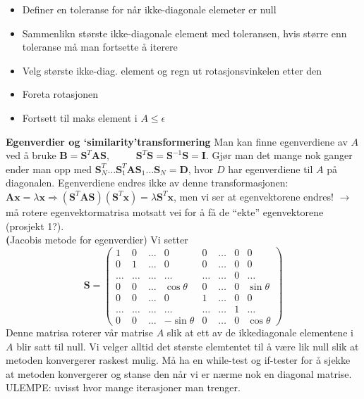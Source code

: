 \documentclass[12pt,a4paper,twocolumn]{article}
\begin{document}
\begin{flushleft}
\begin{itemize}
  \item Definer en toleranse for når ikke-diagonale elemeter er null
  \item Sammenlikn største ikke-diagonale element med toleransen, hvis større enn toleranse må man fortsette å iterere
  \item Velg største ikke-diag. element og regn ut rotasjonsvinkelen etter den
  \item Foreta rotasjonen
  \item Fortsett til maks element i $A\leq\epsilon$
\end{itemize}
\textbf{Egenverdier og `similarity'transformering} Man kan finne egenverdiene av $A$ ved å bruke $\mathbf{B}= \mathbf{S}^T \mathbf{A}\mathbf{S},\, \hspace{1cm}  \mathbf{S}^T\mathbf{S}=\mathbf{S}^{-1}\mathbf{S} =\mathbf{I}$. Gjør man det mange nok ganger ender man opp med $\mathbf{S}_N^T\dots \mathbf{S}_1^T\mathbf{A}\mathbf{S}_1\dots \mathbf{S}_N=\mathbf{D}$, hvor $D$ har egenverdiene til $A$ på diagonalen. Egenverdiene endres ikke av denne transformasjonen: $\mathbf{A}\mathbf{x}=\lambda\mathbf{x} \Rightarrow (\mathbf{S}^T\mathbf{A}\mathbf{S})(\mathbf{S}^T\mathbf{x})=\lambda\mathbf{S}^T\mathbf{x}$, men vi ser at egenvektorene endres! $\to$ må rotere egenvektormatrisa motsatt vei for å få de ``ekte'' egenvektorene (prosjekt 1?).\\
\textbf(Jacobis metode for egenverdier) Vi setter
$$ \mathbf{S}=
 \left( 
   \begin{array}{cccccccc}
   1  &    0  & \dots &   0        &    0  & \dots & 0 &   0       \\
   0  &    1  & \dots &   0        &    0  & \dots & 0 &   0       \\
\dots & \dots & \dots & \dots      & \dots & \dots & 0 & \dots     \\ 
   0  &    0  & \dots & \cos\theta  &    0  & \dots & 0 & \sin\theta \\
   0  &    0  & \dots &   0        &    1  & \dots & 0 &   0       \\
\dots & \dots & \dots & \dots      & \dots & \dots & 1 & \dots     \\
   0  &    0  & \dots &  -\sin\theta        &    0  & \dots & 0 &   \cos\theta   
   \end{array}
 \right) $$
 Denne matrisa roterer vår matrise $A$ slik at ett av de ikkediagonale elementene i $A$ blir satt til null. Vi velger alltid det største elemtentet til å være lik null slik at metoden konvergerer raskest mulig. Må ha en while-test og if-tester for å sjekke at metoden konvergerer og stanse den når vi er nærme nok en diagonal matrise. ULEMPE: uvisst hvor mange iterasjoner man trenger.\\

\end{flushleft}
\end{document}
